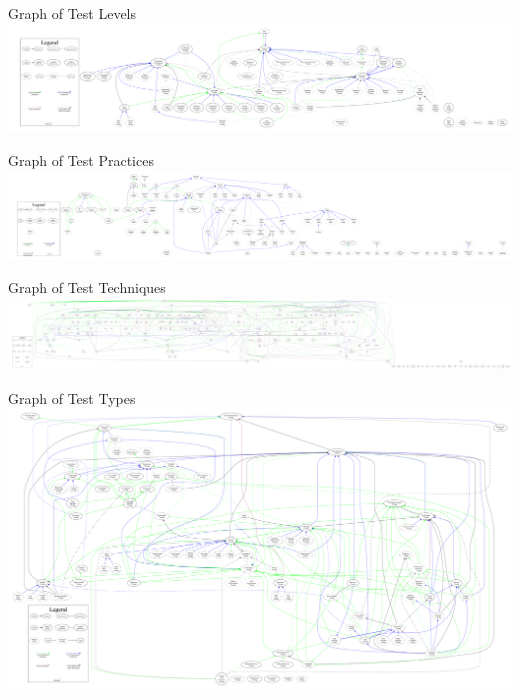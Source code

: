 \begin{frame}{Graph of Test Levels}
    \includegraphics[width=\textwidth]{assets/graphs/levelGraph.pdf}
\end{frame}

\begin{frame}{Graph of Test Practices}
    \includegraphics[width=\textwidth]{assets/graphs/practiceGraph.pdf}
\end{frame}

\begin{frame}{Graph of Test Techniques}
    \includegraphics[width=\textwidth]{assets/graphs/techniqueGraph.pdf}
\end{frame}

\begin{frame}{Graph of Test Types}
    \includegraphics[width=\textwidth]{assets/graphs/typeGraph.pdf}
\end{frame}


